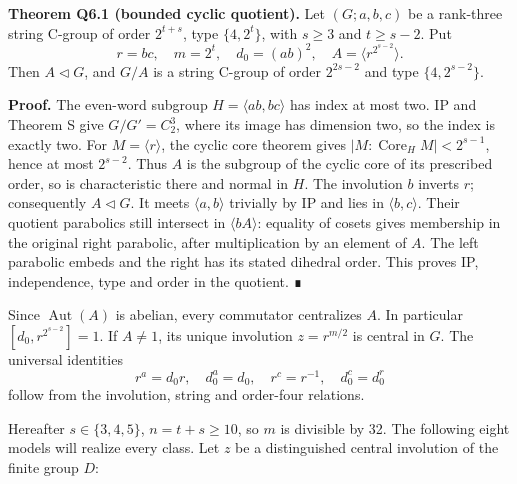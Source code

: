 \documentclass[
  10pt,
  letterpaper,
]{article}
\begin{document}
\textbf{Theorem Q6.1 (bounded cyclic quotient).} Let \((G;a,b,c)\) be a
rank-three string C-group of order \(2^{t+s}\), type \(\{4,2^t\}\), with
\(s\ge3\) and \(t\ge s-2\). Put \[
 r=bc,\quad m=2^t,\quad d_0=(ab)^2,\quad
 A=\langle r^{2^{s-2}}\rangle.
\] Then \(A\lhd G\), and \(G/A\) is a string C-group of order
\(2^{2s-2}\) and type \(\{4,2^{s-2}\}\).

\textbf{Proof.} The even-word subgroup \(H=\langle ab,bc\rangle\) has
index at most two. IP and Theorem S give \(G/G'=C_2^3\), where its image
has dimension two, so the index is exactly two. For
\(M=\langle r\rangle\), the cyclic core theorem gives
\(|M:\operatorname{Core}_H M|<2^{s-1}\), hence at most \(2^{s-2}\). Thus
\(A\) is the subgroup of the cyclic core of its prescribed order, so is
characteristic there and normal in \(H\). The involution \(b\) inverts
\(r\); consequently \(A\lhd G\). It meets \(\langle a,b\rangle\)
trivially by IP and lies in \(\langle b,c\rangle\). Their quotient
parabolics still intersect in \(\langle bA\rangle\): equality of cosets
gives membership in the original right parabolic, after multiplication
by an element of \(A\). The left parabolic embeds and the right has its
stated dihedral order. This proves IP, independence, type and order in
the quotient. ∎

Since \(\operatorname{Aut}(A)\) is abelian, every commutator centralizes
\(A\). In particular \([d_0,r^{2^{s-2}}]=1\). If \(A\ne1\), its unique
involution \(z=r^{m/2}\) is central in \(G\). The universal identities
\[
 r^a=d_0r,\quad d_0^a=d_0,\quad r^c=r^{-1},\quad d_0^c=d_0^r       \tag{Q6.1}
\] follow from the involution, string and order-four relations.

Hereafter \(s\in\{3,4,5\}\), \(n=t+s\ge10\), so \(m\) is divisible by
32. The following eight models will realize every class. Let \(z\) be a
distinguished central involution of the finite group \(D\):
\end{document}
